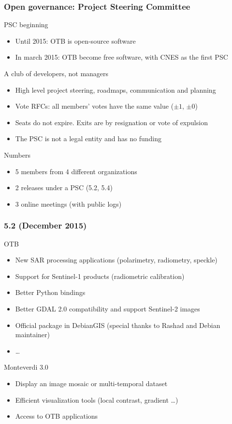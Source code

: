 \documentclass[8pt]{beamer}
\begin{document}
\begin{frame}
\frametitle{Open governance: Project Steering Committee}
\begin{block}{PSC beginning}
  \begin{itemize}
  \item Until 2015: OTB is open-source software
  \item In march 2015: OTB become free software, with CNES as the first PSC
  \end{itemize}
\end{block}
\begin{block}{A club of developers, not managers}
  \begin{itemize}
  \item High level project steering, roadmaps, communication and planning
  \item Vote RFCs: all members' votes have the same value ($\pm 1$, $\pm 0$)
  \item Seats do not expire. Exits are by resignation or vote of expulsion
  \item The PSC is not a legal entity and has no funding
  \end{itemize}
\end{block}
\begin{block}{Numbers}
  \begin{itemize}
  \item 5 members from 4 different organizations
  \item 2 releases under a PSC (5.2, 5.4)
  \item 3 online meetings (with public logs)
  \end{itemize}
\end{block}
\end{frame}

\begin{frame}
\frametitle{5.2 (December 2015)}
\begin{block}{OTB}
\begin{itemize}
\item New SAR processing applications (polarimetry, radiometry, speckle)
\item Support for Sentinel-1 products (radiometric calibration)
\item Better Python bindings
\item Better GDAL 2.0 compatibility and support Sentinel-2 images
\item Official package in DebianGIS (special thanks to Rashad and Debian maintainer)
\item \ldots
\end{itemize}
\end{block}

\begin{block}{Monteverdi 3.0}
\begin{itemize}
\item Display an image mosaic or multi-temporal dataset
\item Efficient visualization tools (local contrast, gradient \ldots)
\item Access to OTB applications
\end{itemize}
\end{block}
\end{frame}
\end{document}
